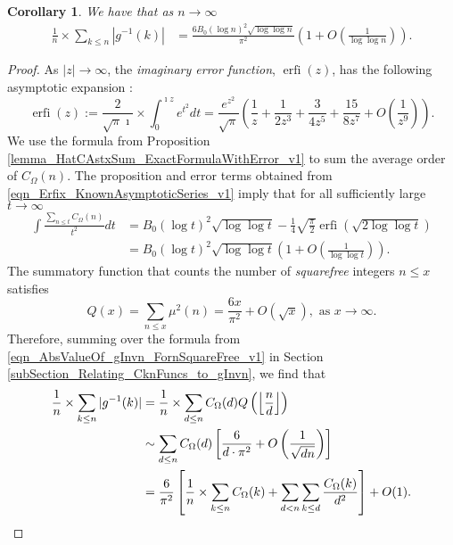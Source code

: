\documentclass[11pt,reqno,a4letter]{article}
\numberwithin{figure}{section}
\numberwithin{table}{section}
\newcommand{\seqnum}[1]{\href{http://oeis.org/#1}{\color{ProcessBlue}{\underline{#1}}}}
\newcommand{\Floor}[2]{\ensuremath{\left\lfloor \frac{#1}{#2} \right\rfloor}}
\theoremstyle{plain}
\newtheorem{cor}[theorem]{Corollary}
\numberwithin{theorem}{section}
\theoremstyle{definition}
\begin{document}
\begin{cor}
\label{cor_ExpectationFormulaAbsgInvn_v2} 
We have that as $n \rightarrow \infty$ 
\begin{align*} 
\frac{1}{n} \times \sum_{k \leq n} |g^{-1}(k)| & = 
     \frac{6B_0 (\log n)^2 \sqrt{\log\log n}}{\pi^2} 
     \left(1 + O\left(\frac{1}{\log\log n}\right)\right). 
\end{align*} 
\end{cor} 
\begin{proof} 
As $|z| \rightarrow \infty$, the \emph{imaginary error function}, 
$\operatorname{erfi}(z)$, has the following asymptotic expansion 
\cite[\S 7.12]{NISTHB}: 
\begin{equation}
\label{eqn_Erfix_KnownAsymptoticSeries_v1}
\operatorname{erfi}(z) := \frac{2}{\sqrt{\pi} \imath} \times \int_0^{\imath z} e^{t^2} dt = 
     \frac{e^{z^2}}{\sqrt{\pi}} \left(\frac{1}{z} + \frac{1}{2z^3} + 
     \frac{3}{4z^5} + \frac{15}{8z^7} + O\left(\frac{1}{z^{9}}\right)\right). 
\end{equation}
We use the formula from Proposition \ref{lemma_HatCAstxSum_ExactFormulaWithError_v1} 
to sum the average order of $C_{\Omega}(n)$.
The proposition and error terms obtained from \eqref{eqn_Erfix_KnownAsymptoticSeries_v1} 
imply that for all sufficiently large $t \rightarrow \infty$ 
\begin{align*} 
\int \frac{\sum_{n \leq t} C_{\Omega}(n)}{t^2} dt & = 
     B_0 (\log t)^2 \sqrt{\log\log t} - \frac{1}{4} \sqrt{\frac{\pi}{2}} 
     \operatorname{erfi}\left(\sqrt{2\log\log t}\right) \\ 
     & = 
     B_0 (\log t)^2 \sqrt{\log\log t} \left(1 + O\left(\frac{1}{\log\log t}\right)\right). 
\end{align*} 
The summatory function that counts the 
number of \emph{squarefree} integers $n \leq x$ satisfies 
\cite[\S 18.6]{HARDYWRIGHT} \cite[\seqnum{A013928}]{OEIS} 
\[ 
Q(x) = \sum_{n \leq x} \mu^2(n) = \frac{6x}{\pi^2} + O\left(\sqrt{x}\right), 
     \text{\ as $x \rightarrow \infty$}. 
\]
Therefore, summing over the formula from 
\eqref{eqn_AbsValueOf_gInvn_FornSquareFree_v1} in 
Section \ref{subSection_Relating_CknFuncs_to_gInvn}, we find that  
\begin{align} 
\notag 
\frac{1}{n} \times \sum_{k \leq n} |g^{-1}(k)| & = \frac{1}{n} \times \sum_{d \leq n} 
     C_{\Omega}(d) Q\left(\Floor{n}{d}\right) \\ 
\notag 
     & \sim \sum_{d \leq n} C_{\Omega}(d) \left[\frac{6}{d \cdot \pi^2} + O\left(\frac{1}{\sqrt{dn}}\right) 
     \right] \\ 
\notag 
     & = \frac{6}{\pi^2} \left[\frac{1}{n} \times \sum_{k \leq n} C_{\Omega}(k) + \sum_{d<n} 
     \sum_{k \leq d} \frac{C_{\Omega}(k)}{d^2}\right] + O(1). 
     \qedhere 
\end{align} 
\end{proof} 
\end{document}
